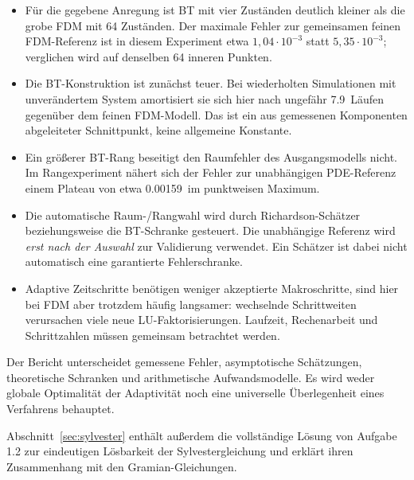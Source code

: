 \documentclass[11pt,a4paper]{article}
\newcommand{\BreakEven}{7.9}
\newcommand{\PDEFloor}{0.00159}
\begin{document}
\begin{itemize}
\item Für die gegebene Anregung ist BT mit vier Zuständen deutlich kleiner als die grobe FDM mit 64 Zuständen. Der maximale Fehler zur gemeinsamen feinen FDM-Referenz ist in diesem Experiment etwa $1{,}04\cdot10^{-3}$ statt $5{,}35\cdot10^{-3}$; verglichen wird auf denselben 64 inneren Punkten.
\item Die BT-Konstruktion ist zunächst teuer. Bei wiederholten Simulationen mit unverändertem System amortisiert sie sich hier nach ungefähr \BreakEven\ Läufen gegenüber dem feinen FDM-Modell. Das ist ein aus gemessenen Komponenten abgeleiteter Schnittpunkt, keine allgemeine Konstante.
\item Ein größerer BT-Rang beseitigt den Raumfehler des Ausgangsmodells nicht. Im Rangexperiment nähert sich der Fehler zur unabhängigen PDE-Referenz einem Plateau von etwa \PDEFloor\ im punktweisen Maximum.
\item Die automatische Raum-/Rangwahl wird durch Richardson-Schätzer beziehungsweise die BT-Schranke gesteuert. Die unabhängige Referenz wird \emph{erst nach der Auswahl} zur Validierung verwendet. Ein Schätzer ist dabei nicht automatisch eine garantierte Fehlerschranke.
\item Adaptive Zeitschritte benötigen weniger akzeptierte Makroschritte, sind hier bei FDM aber trotzdem häufig langsamer: wechselnde Schrittweiten verursachen viele neue LU-Faktorisierungen. Laufzeit, Rechenarbeit und Schrittzahlen müssen gemeinsam betrachtet werden.
\end{itemize}

Der Bericht unterscheidet gemessene Fehler, asymptotische Schätzungen, theoretische Schranken und arithmetische Aufwandsmodelle. Es wird weder globale Optimalität der Adaptivität noch eine universelle Überlegenheit eines Verfahrens behauptet.

Abschnitt~\ref{sec:sylvester} enthält außerdem die vollständige Lösung von Aufgabe 1.2 zur eindeutigen Lösbarkeit der Sylvestergleichung und erklärt ihren Zusammenhang mit den Gramian-Gleichungen.
\tableofcontents
\clearpage
{}

\end{document}
